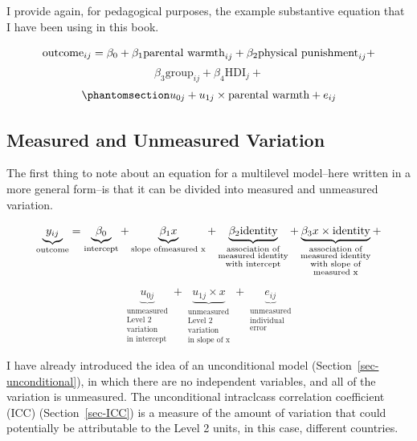 \documentclass[
  letterpaper,
  DIV=11,
  numbers=noendperiod]{scrreprt}
\begin{document}
I provide again, for pedagogical purposes, the example substantive
equation that I have been using in this book.

\[\text{outcome}_{ij} = \beta_0 + \beta_1 \text{parental warmth}_{ij} + \\ \beta_2 \text{physical punishment}_{ij} +\]
\[\beta_3 \text{group}_{ij} + \beta_4 \text{HDI}_{j} + \]
\begin{equation}\phantomsection\label{eq-MLMsubstantive2}{u_{0j} + u_{1j} \times \text{parental warmth} + e_{ij}}\end{equation}

\subsection{Measured and Unmeasured
Variation}\label{measured-and-unmeasured-variation}

The first thing to note about an equation for a multilevel model--here
written in a more general form--is that it can be divided into measured
and unmeasured variation.

\[\underbrace{y_{ij}}_\text{outcome} = \underbrace{\beta_0}_\text{intercept} + \underbrace{\beta_1 x}_{\text{slope of} \\ \text{measured x}} + \underbrace{\beta_2 \text{identity}}_{\substack{\text{association of} \\ \text{measured identity} \\ \text{with intercept}}} + \underbrace{\beta_3 x \times \text{identity}}_{\substack{\text{association of} \\ \text{measured identity} \\ \text{with slope of} \\  \text{measured x}}} + \]

\[\underbrace{u_{0j}}_{\substack{\text{unmeasured} \\ \text{Level 2} \\ \text{variation} \\ \text{in intercept}}} + \underbrace{u_{1j} \times x}_{\substack{\text{unmeasured} \\ \text{Level 2} \\ \text{variation} \\ \text{in slope of x}}} + \underbrace{e_{ij}}_{\substack{\text{unmeasured} \\ \text{individual} \\ \text{error}}}\]

I have already introduced the idea of an unconditional model
(Section~\ref{sec-unconditional}), in which there are no independent
variables, and all of the variation is unmeasured. The unconditional
intraclcass correlation coefficient (ICC) (Section~\ref{sec-ICC}) is a
measure of the amount of variation that could potentially be
attributable to the Level 2 units, in this case, different countries.
\end{document}
